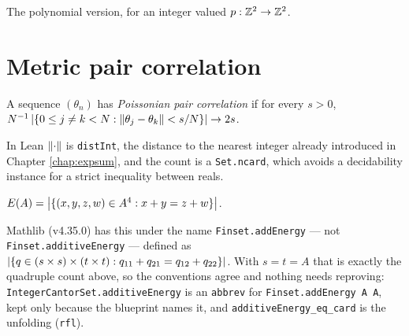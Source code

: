 \begin{theorem}[Theorem 6.4]
  \label{thm:polyMeanErgodic}
  \notready
  The polynomial version, for an integer valued $p : \mathbb{Z}^2 \to \mathbb{Z}^2$.
\end{theorem}

\chapter{Metric pair correlation}
\label{chap:paircorr}

\begin{definition}
  \label{def:pairCorrelation}
  \leanok
  A sequence $(\theta_n)$ has \emph{Poissonian pair correlation} if for every
  $s > 0$,
  $N^{-1}\left\lvert \{0 \leq j \neq k < N : \left\lVert \theta_j - \theta_k \right\rVert < s/N\} \right\rvert
  \to 2s$.

  In Lean $\left\lVert \cdot \right\rVert$ is \texttt{distInt}, the distance to the nearest
  integer already introduced in Chapter \ref{chap:expsum}, and the count is a
  \texttt{Set.ncard}, which avoids a decidability instance for a strict
  inequality between reals.
\end{definition}

\begin{definition}
  \label{def:additiveEnergy}
  \leanok
  $E(A) = \left\lvert \{(x,y,z,w) \in A^4 : x + y = z + w\} \right\rvert$.

  Mathlib (v4.35.0) has this under the name \texttt{Finset.addEnergy} --- not
  \texttt{Finset.additiveEnergy} --- defined as
  $\left\lvert \{q \in (s \times s) \times (t \times t) : q_{11} + q_{21} = q_{12} +
  q_{22}\} \right\rvert$.  With $s = t = A$ that is exactly the quadruple count above, so
  the conventions agree and nothing needs reproving:
  \texttt{IntegerCantorSet.additiveEnergy} is an \texttt{abbrev} for
  \texttt{Finset.addEnergy A A}, kept only because the blueprint names it, and
  \texttt{additiveEnergy\_eq\_card} is the unfolding (\texttt{rfl}).
\end{definition}


